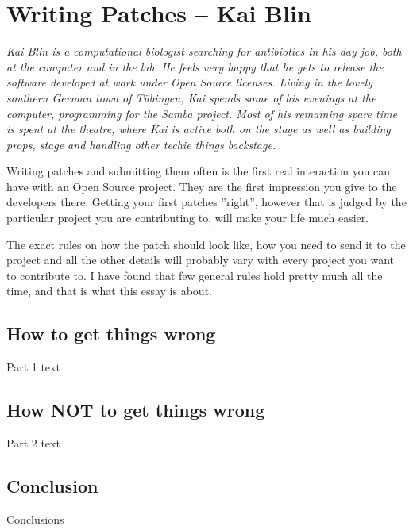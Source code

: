 \chapter{Writing Patches -- Kai Blin}

\textit{Kai Blin is a computational biologist searching for antibiotics in his
    day job, both at the computer and in the lab. He feels very happy that he
    gets to release the software developed at work under Open Source licenses.
    Living in the lovely southern German town of T\"ubingen, Kai spends some of
    his evenings at the computer, programming for the Samba project. Most of
    his remaining spare time is spent at the theatre, where Kai is active both
    on the stage as well as building props, stage and handling other techie
    things backstage.}

Writing patches and submitting them often is the first real interaction you can
have with an Open Source project. They are the first impression you give to the
developers there. Getting your first patches ''right'', however that is judged
by the particular project you are contributing to, will make your life much
easier.

The exact rules on how the patch should look like, how you need to send it to
the project and all the other details will probably vary with every project you
want to contribute to. I have found that few general rules hold pretty much all
the time, and that is what this essay is about.

\section*{How to get things wrong}

Part 1 text


\section*{How NOT to get things wrong}

Part 2 text


\section*{Conclusion}

Conclusions
